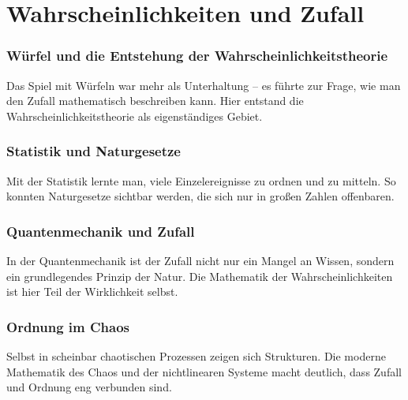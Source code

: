 \chapter{Wahrscheinlichkeiten und Zufall}
\label{chap:V_wahrscheinlichkeit}
\label{chap:V_realisationen}
\setcounter{section}{5}
\setcounter{subsection}{0}
\setcounter{subsubsection}{1}
\setcounter{secnumdepth}{3}
\setlength{\parindent}{0pt}


\subsection{Würfel und die Entstehung der Wahrscheinlichkeitstheorie}
Das Spiel mit Würfeln war mehr als Unterhaltung – es führte zur Frage, 
wie man den Zufall mathematisch beschreiben kann. 
Hier entstand die Wahrscheinlichkeitstheorie als eigenständiges Gebiet. 

\subsection{Statistik und Naturgesetze}
Mit der Statistik lernte man, viele Einzelereignisse zu ordnen und zu mitteln. 
So konnten Naturgesetze sichtbar werden, die sich nur in großen Zahlen offenbaren. 

\subsection{Quantenmechanik und Zufall}
In der Quantenmechanik ist der Zufall nicht nur ein Mangel an Wissen, 
sondern ein grundlegendes Prinzip der Natur. 
Die Mathematik der Wahrscheinlichkeiten ist hier Teil der Wirklichkeit selbst. 

\subsection{Ordnung im Chaos}
Selbst in scheinbar chaotischen Prozessen zeigen sich Strukturen. 
Die moderne Mathematik des Chaos und der nichtlinearen Systeme 
macht deutlich, dass Zufall und Ordnung eng verbunden sind. 
